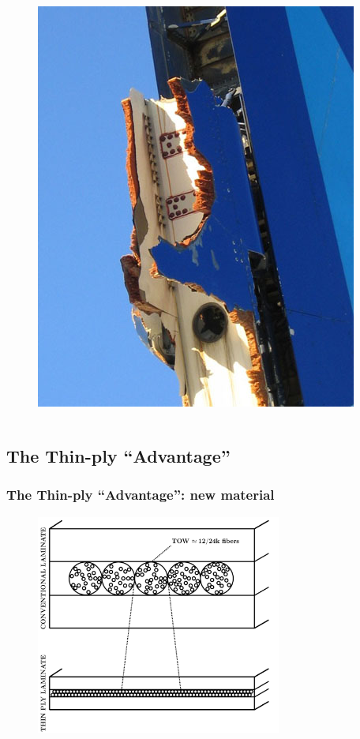 \documentclass[first,firstsupp,lastsupp,last,hyperref,table]{ETHclass}
\begin{document}
\begin{frame}
\begin{columns}[c]
\begin{column}{0.5\textwidth}
\begin{figure}
\includegraphics[width=0.8\columnwidth]{A310-308-detail.jpg}
\end{figure}
\end{column}
\end{columns}
\end{frame}

\subsection{The Thin-ply ``Advantage''}

\begin{frame}
\frametitle{\vspace{0.3cm}\small The Thin-ply ``Advantage'': new material}
\vspace{-0.8cm}
\centering
\begin{figure}
\centering
\includegraphics[width=0.72\textwidth]{spread-tow-tech.pdf}
\end{figure}
\end{frame}
\end{document}
